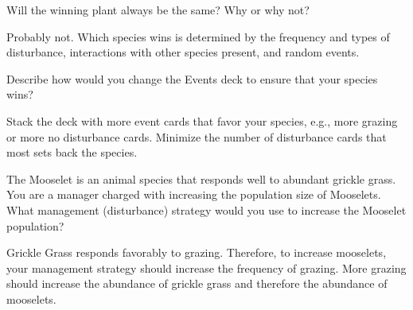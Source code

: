 \documentclass[12pt, hidelinks]{exam}
\newcommand*\AnswerBox[2]{%
    \parbox[t][#1]{0.92\textwidth}{%
    \begin{solution}#2\end{solution}}
    \vspace{\stretch{1}}
}
\newlength{\basespace}
\begin{document}
\begin{questions}
\question
Will the winning plant always be the same? Why or why not?

\AnswerBox{0.2\basespace}{Probably not. Which species wins is determined
	by the frequency and types of disturbance, interactions with other species
	present, and random events.}

\question[Checkout]
Describe how would you change the Events deck to ensure that your species wins?

\AnswerBox{0.2\basespace}{Stack the deck with more event cards that
	favor your species, e.g., more grazing or more no disturbance cards.
	Minimize the number of disturbance cards that most sets back the species.}


\question[Checkout]
The Mooselet is an animal species that responds well to abundant grickle grass. You are a manager charged with increasing the population size of Mooselets. What management (disturbance) strategy would you use to increase the Mooselet population?

\AnswerBox{0.5\basespace}{Grickle Grass responds favorably to grazing. Therefore, to increase
	mooselets, your management strategy should increase the frequency of grazing. More grazing
	should increase the abundance of grickle grass and therefore the abundance of mooselets.}



\end{questions}
	
\end{document}
